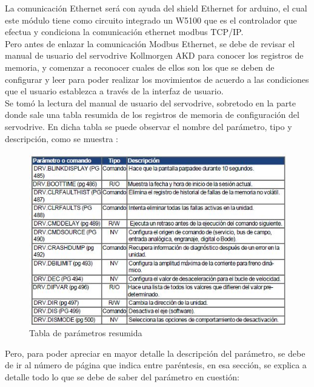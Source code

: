 \documentclass[12pt,titlepage]{article}
\begin{document}
La comunicación Ethernet será con ayuda del shield Ethernet for arduino, el cual este módulo tiene como circuito integrado un W5100 que es el controlador que efectua y condiciona la comunicación ethernet modbus TCP/IP. \\

Pero antes de enlazar la comunicación Modbus Ethernet, se debe de revisar el manual de usuario del servodrive Kollmorgen AKD para conocer los registros de memoria, y comenzar a reconocer cuales de ellos son los que se deben de configurar y leer para poder realizar los movimientos de acuerdo a las condiciones que el usuario establezca a través de la interfaz de usuario.\\ 

Se tomó la lectura del manual de usuario del servodrive, sobretodo en la parte donde sale una tabla resumida de los registros de memoria de configuración del servodrive. En dicha tabla se puede observar el nombre del parámetro, tipo y descripción, como se muestra : 

 \begin{figure}[htbp]
\hspace*{1.1cm} 
\includegraphics[scale=1.1]{param_kollmorgen}
\caption{Tabla de parámetros resumida}
\end{figure}
\newpage
Pero, para poder apreciar en mayor detalle la descripción del parámetro, se debe de ir al número de página que indica entre paréntesis, en esa sección,  se explica a detalle todo lo que se debe de saber del parámetro en cuestión: \\
\end{document}
